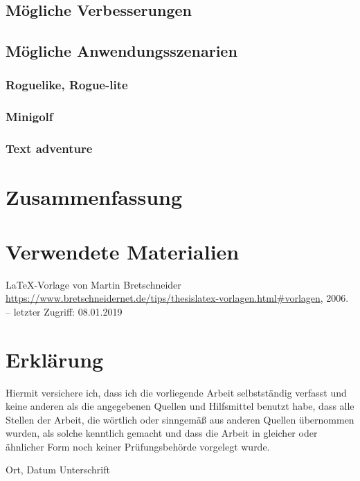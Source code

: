 \section{Mögliche Verbesserungen}\label{s.verbesserungen}

\section{Mögliche Anwendungsszenarien}\label{s.anwendungsmöglichkeiten}

\subsection{Roguelike, Rogue-lite}

\subsection{Minigolf}

\subsection{Text adventure}


\chapter{Zusammenfassung}\label{c.zusammenfassung}


\chapter{Verwendete Materialien}
\LaTeX -Vorlage von Martin Bretschneider 
\newblock \url{https://www.bretschneidernet.de/tips/thesislatex-vorlagen.html#vorlagen}, 2006. --
\newblock letzter Zugriff: 08.01.2019




\chapter{Erklärung}

Hiermit versichere ich, dass ich die vorliegende Arbeit selbstständig verfasst und keine anderen als die angegebenen Quellen und Hilfsmittel benutzt habe, dass alle Stellen der Arbeit, die wörtlich oder sinngemäß aus anderen Quellen übernommen wurden, als solche kenntlich gemacht und dass die Arbeit in gleicher oder ähnlicher Form noch keiner Prüfungsbehörde vorgelegt wurde.

\vspace{3cm}
Ort, Datum \hspace{5cm} Unterschrift \\

